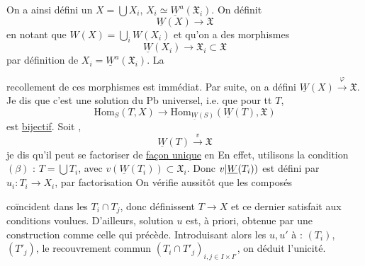 On a ainsi défini un $X=\bigcup X_i$, $X_i\simeq\underline W^a(\mathfrak X_i)$. On définit
\[
\underline W(X)\longrightarrow\mathfrak X
\]
en notant que $W(X)=\bigcup_i W(X_i)$  et qu'on a des  morphismes
\[
\underline W(X_i)\longrightarrow\mathfrak X_i\subset\mathfrak X
\]
par définition de $X_i=\underline W^a(\mathfrak X_i)$. La

recollement de ces morphismes est immédiat.
Par suite, on a défini $\underline W(X)\xrightarrow{\varphi}\mathfrak X$.
Je dis que c'est une solution du Pb universel, i.e. que pour tt $T$,
\[
\mathrm{Hom}_S(T,X)\longrightarrow
\mathrm{Hom}_{\underline W(S)}(\underline W(T),\mathfrak X)
\]
est \uline{bijectif}. Soit ,
\[
\underline W(T)\xrightarrow{v}\mathfrak X
\]
je dis qu'il peut se factoriser de \uline{façon unique} en
En effet, 
 
utilisons la condition $(\beta)$ : $T=\bigcup T_i$,
avec $v(\underline W(T_i))\subset\mathfrak X_i$. Donc
$v|\underline W(T_i))$ est défini par $u_i:T_i\to X_i$,
par factorisation
On vérifie aussitôt que les composés

coïncident dans les $T_i\cap T_j$, donc définissent
$T\to X$ et ce dernier satisfait aux conditions voulues.
D'ailleurs,  solution $u$ est, à priori, obtenue
par une construction comme celle qui précède.
Introduisant alors les  $u,u'$  à :
$(T_i)$, $(T'_j)$, le recouvrement commun $(T_i\cap T'_j)_{i,j\in I\times I'}$,
on déduit l'unicité.

